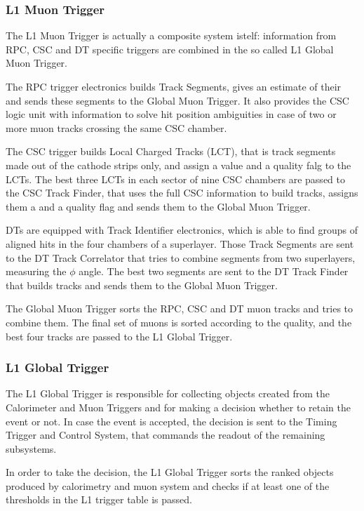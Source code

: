 \subsubsection{L1 Muon Trigger}

The L1 Muon Trigger is actually a composite system istelf: information from RPC, CSC and DT specific triggers are combined in the so called L1 Global Muon Trigger. 

The RPC trigger electronics builds Track Segments, gives an estimate of their \pt and sends these segments to the Global Muon Trigger. It also provides the CSC logic unit with information to solve hit position ambiguities in case of two or more muon tracks crossing the same CSC chamber. 

The CSC trigger builds Local Charged Tracks (LCT), that is track segments made out of the cathode strips only, and assign a \pt value and a quality falg to the LCTs. The best three LCTs in each sector of nine CSC chambers are passed to the CSC Track Finder, that uses the full CSC information to build tracks, assigns them a \pt and a quality flag and sends them to the Global Muon Trigger.

DTs are equipped with Track Identifier electronics, which is able to find groups of aligned hits in the four chambers of a superlayer. Those Track Segments are sent to the DT Track Correlator that tries to combine segments from two superlayers, measuring the $\phi$ angle. The best two segments are sent to the DT Track Finder that builds tracks and sends them to the Global Muon Trigger.

The Global Muon Trigger sorts the RPC, CSC and DT muon tracks and tries to combine them. The final set of muons is sorted according to the quality, and the best four tracks are passed to the L1 Global Trigger.

\subsubsection{L1 Global Trigger}

The L1 Global Trigger is responsible for collecting objects created from the Calorimeter and Muon Triggers and for making a decision whether to retain the event or not. In case the event is accepted, the decision is sent to the Timing Trigger and Control System, that commands the readout of the remaining subsystems.

In order to take the decision, the L1 Global Trigger sorts the ranked objects produced by calorimetry and muon system and checks if at least one of the thresholds in the L1 trigger table is passed.

